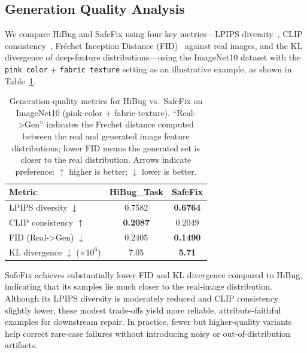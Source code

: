 \documentclass[10pt]{article} %
\newcommand{\model}{SafeFix\xspace}
\newcommand{\hibug}{HiBug\xspace}
\begin{document}
\subsection{Generation Quality Analysis}
We compare \hibug{} and \model{} using four key metrics—LPIPS diversity~\citep{zhang2018unreasonable}, CLIP consistency~\citep{radford2021learning}, Fréchet Inception Distance (FID)~\citep{heusel2017gans} against real images, and the KL divergence of deep-feature distributions—using the ImageNet10 dataset with the \texttt{pink color} + \texttt{fabric texture} setting as an illustrative example, as shown in Table~\ref{tab:gen_metrics}.



\begin{table}[ht]
  \centering
  \small
  \setlength{\tabcolsep}{8pt}
  \renewcommand{\arraystretch}{1.1}
  \caption{Generation-quality metrics for \hibug{} vs.\ \model{} on ImageNet10 (pink-color + fabric-texture). ``Real->Gen'' indicates the Frechet distance computed between the real and generated image feature distributions; lower FID means the generated set is closer to the real distribution. Arrows indicate preference: $\uparrow$ higher is better; $\downarrow$ lower is better.}
  \label{tab:gen_metrics}
  \begin{tabular}{lcc}
    \toprule
    \textbf{Metric} & \textbf{HiBug\_Task}& \textbf{SafeFix} \\
    \midrule
    LPIPS diversity $\downarrow$    & 0.7582           & \textbf{0.6764}   \\
    CLIP consistency $\uparrow$   & \textbf{0.2087}           & 0.2049   \\
    FID (Real->Gen) $\downarrow$      & 0.2405           & \textbf{0.1490}   \\
    KL divergence $\downarrow$ ($\times10^{6}$) & 7.05               & \textbf{5.71}   \\
    \bottomrule
  \end{tabular}
\end{table}

\model{} achieves substantially lower FID and KL divergence compared to \hibug{}, indicating that its samples lie much closer to the real‐image distribution. Although its LPIPS diversity is moderately reduced and CLIP consistency slightly lower, these modest trade‐offs yield more reliable, attribute‐faithful examples for downstream repair. In practice, fewer but higher‐quality variants help correct rare-case failures without introducing noisy or out‐of‐distribution artifacts.
\end{document}
